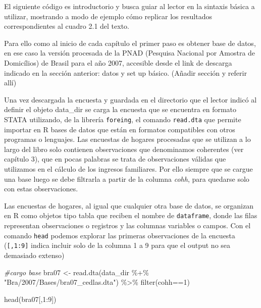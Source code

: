 \documentclass[
]{book}
\newenvironment{Shaded}{\begin{snugshade}}{\end{snugshade}}
\newcommand{\CommentTok}[1]{\textcolor[rgb]{0.56,0.35,0.01}{\textit{#1}}}
\newcommand{\DecValTok}[1]{\textcolor[rgb]{0.00,0.00,0.81}{#1}}
\newcommand{\FunctionTok}[1]{\textcolor[rgb]{0.00,0.00,0.00}{#1}}
\newcommand{\NormalTok}[1]{#1}
\newcommand{\OtherTok}[1]{\textcolor[rgb]{0.56,0.35,0.01}{#1}}
\newcommand{\SpecialCharTok}[1]{\textcolor[rgb]{0.00,0.00,0.00}{#1}}
\newcommand{\StringTok}[1]{\textcolor[rgb]{0.31,0.60,0.02}{#1}}
\begin{document}
El siguiente código es introductorio y busca guiar al lector en la sintaxis básica a utilizar, mostrando a modo de ejemplo cómo replicar los resultados correspondientes al cuadro 2.1 del texto.

Para ello como al inicio de cada capítulo el primer paso es obtener base de datos, en ese caso la versión procesada de la PNAD (Pesquisa Nacional por Amostra de Domicílios) de Brasil para el año 2007, accesible desde el link de descarga indicado en la sección anterior: datos y set up básico. (Añadir sección y referir allí)

Una vez descargada la encuesta y guardada en el directorio que el lector indicó al definir el objeto data\_dir se carga la encuesta que se encuentra en formato STATA utilizando, de la librería \texttt{foreing}, el comando \texttt{read.dta} que permite importar en R bases de datos que están en formatos compatibles con otros programas o lenguajes. Las encuestas de hogares procesadas que se utilizan a lo largo del libro solo contienen observaciones que denominamos coherentes (ver capítulo 3), que en pocas palabras se trata de observaciones válidas que utilizamos en el cálculo de los ingresos familiares. Por ello siempre que se cargue una base luego se debe filtrarla a partir de la columna \emph{cohh}, para quedarse solo con estas observaciones.

Las encuestas de hogares, al igual que cualquier otra base de datos, se organizan en R como objetos tipo tabla que reciben el nombre de \texttt{dataframe}, donde las filas representan observaciones o registros y las columnas variables o campos. Con el comando \texttt{head} podemos explorar las primeras observaciones de la encuesta (\texttt{{[},1:9{]}} indica incluir solo de la columna 1 a 9 para que el output no sea demasiado extenso)

\begin{Shaded}
\begin{Highlighting}[]
\CommentTok{\#cargo base}
\NormalTok{bra07 }\OtherTok{\textless{}{-}} \FunctionTok{read.dta}\NormalTok{(data\_dir }\SpecialCharTok{\%+\%} \StringTok{"Bra/2007/Bases/bra07\_cedlas.dta"}\NormalTok{) }\SpecialCharTok{\%\textgreater{}\%} 
         \FunctionTok{filter}\NormalTok{(cohh}\SpecialCharTok{==}\DecValTok{1}\NormalTok{)}

\FunctionTok{head}\NormalTok{(bra07[,}\DecValTok{1}\SpecialCharTok{:}\DecValTok{9}\NormalTok{])}
\end{Highlighting}
\end{Shaded}
\end{document}
